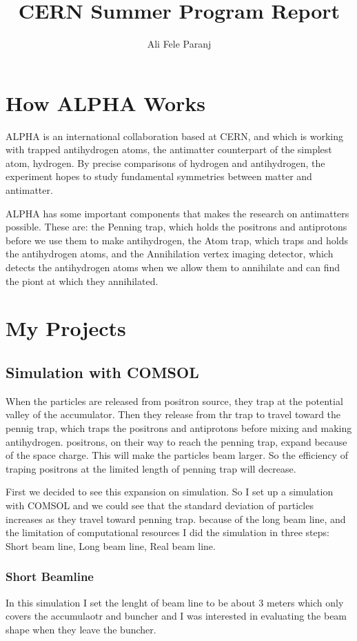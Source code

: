 \documentclass{article}
\title{CERN Summer Program Report}
\author{Ali Fele Paranj}
\begin{document}
\maketitle

\section{How ALPHA Works}
ALPHA is an international collaboration based at CERN, and which is working with trapped antihydrogen atoms, the antimatter counterpart of the simplest atom, hydrogen. By precise comparisons of hydrogen and antihydrogen, the experiment hopes to study fundamental symmetries between matter and antimatter. 

ALPHA has some important components that makes the research on antimatters possible. These are: the Penning trap, which holds the positrons and antiprotons before we use them to make antihydrogen, the Atom trap, which traps and holds the antihydrogen atoms, and the Annihilation vertex imaging detector, which detects the antihydrogen atoms when we allow them to annihilate and can find the piont at which they annihilated.

\section{My Projects}
\subsection{Simulation with COMSOL}
When the particles are released from positron source, they trap at the potential valley of the accumulator. Then they release from thr trap to travel toward the pennig trap, which traps the positrons and antiprotons before mixing and making antihydrogen.  positrons, on their way to reach the penning trap, expand because of the space charge. This will make the particles beam larger. So the efficiency of traping positrons at the limited length of penning trap will decrease.


First we decided to see this expansion on simulation. So I set up a simulation with COMSOL and we could see that the standard deviation of particles increases as they travel toward penning trap. because of the long beam line, and the limitation of computational resources I did the simulation in three steps: Short beam line, Long beam line, Real beam line.
\subsubsection{Short Beamline}
In this simulation I set the lenght of beam line to be about 3 meters which only covers the accumulaotr and buncher and I was interested in evaluating the beam shape when they leave the buncher.
\end{document}
